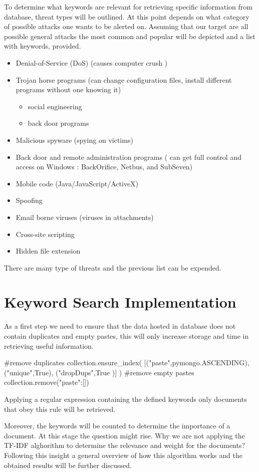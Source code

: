 \documentclass[12pt]{article}
\begin{document}
To determine what keywords are relevant for retrieving specific information from database, threat types will be outlined. At this point depends on what category of possible attacks one wants to be alerted on. Assuming that our target are all possible general attacks the most common and popular will be depicted and a list with keywords, provided. 

\begin{itemize}
\item Denial-of-Service (DoS) (causes computer crush )
\item Trojan horse programs (can change configuration files, install different programs without one knowing it)
\begin{itemize}
\item social engineering
\item back door programs
\end{itemize}
\item Malicious spyware (spying on victims) 
\item Back door and remote administration programs ( can get full control and access on Windows : BackOrifice, Netbus, and SubSeven) 
\item Mobile code (Java/JavaScript/ActiveX)
\item Spoofing
\item Email borne viruses (viruses in attachments)
\item Cross-site scripting
\item Hidden file extension
\end{itemize}

There are many type of threats and the previous list can be expended.  

\section{Keyword Search Implementation}
As a first step we need to ensure that the data hosted in database does not contain duplicates and empty pastes, this will only increase storage and time in retrieving useful information.
\begin{spverbatim}
#remove duplicates
collection.ensure_index( [("paste",pymongo.ASCENDING),
 ("unique",True), ("dropDups",True )] )
#remove empty pastes
collection.remove({"paste":[]})
\end{spverbatim}
\hfill \break
Applying a regular expression containing the defined keywords only documents that obey this rule will be retrieved.
\begin{spverbatim}
\end{spverbatim}
Moreover, the keywords will be counted to determine the importance of a document. At this stage the question might rise. Why we are not applying the TF-IDF alghorithm to determine the relevance and weight for the documents? 
Following this insight a general overview of how this algorithm works and the obtained results will be further discussed. 
\end{document}

